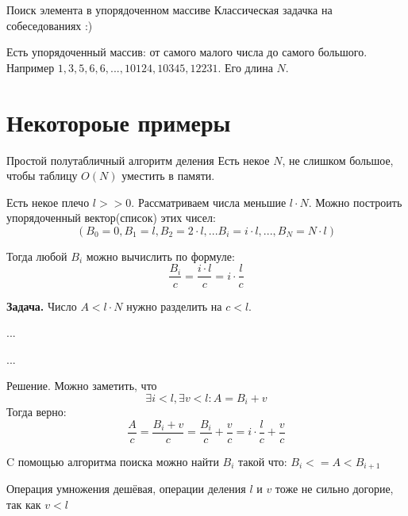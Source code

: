 \begin{frame}{Поиск элемента в упорядоченном массиве}
	Классическая задачка на собеседованиях :)
	
	Есть упорядоченный массив: от самого малого числа до самого большого. 
	Например $1, 3, 5, 6, 6, ..., 10124, 10345, 12231$. 
	Его длина $N$.
	
	
	
\end{frame}





\section{Некотороые примеры}\label{section:examples_1}

\begin{frame}{Простой полутабличный алгоритм деления}\label{frame:example_table_method}
	Есть некое $N$, не слишком большое, чтобы таблицу $O(N)$ уместить в памяти.
	
	Есть некое плечо $l>>0$. Рассматриваем числа меньшие $l \cdot N$. 
	Можно построить упорядоченный вектор(список) этих чисел:
	\begin{equation}\label{eq:example_table_method_vector_def}
	(B_0=0, B_1 = l, B_2 = 2 \cdot l, ... B_i = i \cdot l, ..., B_N = N \cdot l )
	\end{equation} 
	
	Тогда любой $B_i$ можно вычислить по формуле:
	\begin{equation}\label{eq:example_table_method_B_i}
	\frac{B_i}{c} = \frac{i \cdot l}{c} = i \cdot \frac{l}{c}
	\end{equation}
	
	
 
 	\textbf{Задача.} Число $A < l \cdot N$ нужно разделить на $c<l$.
	
	...
\end{frame}
\begin{frame}
 	...
 	
 	Решение. Можно заметить, что 
 	\begin{equation}
 	\exists i<l, \exists v<l: A = B_i+v
 	\end{equation}
 	Тогда верно:
 	\begin{equation}
 	\frac{A}{c} = \frac{B_i+v}{c} = \frac{B_i}{c} + \frac{v}{c} = i \cdot \frac{l}{c} + \frac{v}{c}
 	\end{equation}
 	
 	C помощью алгоритма поиска можно найти $B_i$ такой что: $B_i <= A < B_{i+1}$ %
 	
 	Операция умножения дешёвая, операции деления $l$ и $v$ тоже не сильно догорие, 
 	так как $v<l$
 	
 	
 
		
	
\end{frame}

